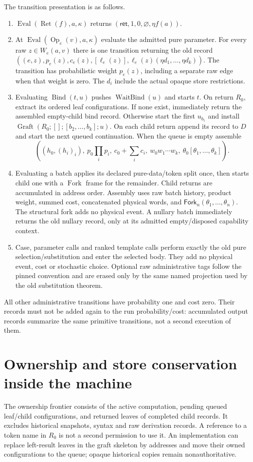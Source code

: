 \documentclass[11pt]{article}
\begin{document}
The transition presentation is as follows.
\begin{enumerate}
\item $\operatorname{Eval}(\operatorname{Ret}(f),a,\kappa)$ returns $(\mathsf{ret},1,0,\varnothing,\eta f(a))$.
\item At $\operatorname{Eval}(\operatorname{Op}_e(v),a,\kappa)$ evaluate the admitted pure parameter. For every raw $z\in W_e(a,v)$ there is one transition returning the old record $( (e,z),p_e(z),c_e(z),[\ell_e(z)],\ell_e(z)(\eta d_1,\ldots,\eta d_k))$. The transition has probabilistic weight $p_e(z)$, including a separate raw edge when that weight is zero. The $d_i$ include the actual opaque store restrictions.
\item Evaluating $\operatorname{Bind}(t,u)$ pushes $\operatorname{WaitBind}(u)$ and starts $t$. On return $R_0$, extract its ordered leaf configurations. If none exist, immediately return the assembled empty-child bind record. Otherwise start the first $u_{b_1}$ and install $\operatorname{Graft}(R_0;[];[b_2,\ldots,b_k];u)$. On each child return append its record to $D$ and start the next queued continuation. When the queue is empty assemble
\[
 ((h_0,(h_i)_i),\ p_0\prod_i p_i,\ c_0+\sum_i c_i,
 \ w_0w_1\cdots w_k,\ \theta_0[\theta_1,\ldots,\theta_k]).
\]
\item Evaluating a batch applies its declared pure-data/token split once, then starts child one with a $\operatorname{Fork}$ frame for the remainder. Child returns are accumulated in address order. Assembly uses raw batch history, product weight, summed cost, concatenated physical words, and $\mathsf{Fork}_n(\theta_1,\ldots,\theta_n)$. The structural fork adds no physical event. A nullary batch immediately returns the old nullary record, only at its admitted empty/disposed capability context.
\item Case, parameter calls and ranked template calls perform exactly the old pure selection/substitution and enter the selected body. They add no physical event, cost or stochastic choice. Optional raw administrative tags follow the pinned convention and are erased only by the same named projection used by the old substitution theorem.
\end{enumerate}
All other administrative transitions have probability one and cost zero. Their records must not be added again to the run probability/cost: accumulated output records summarize the same primitive transitions, not a second execution of them.

\section{Ownership and store conservation inside the machine}
The ownership frontier consists of the active computation, pending queued leaf/child configurations, and returned leaves of completed child records. It excludes historical snapshots, syntax and raw derivation records. A reference to a token name in $R_0$ is not a second permission to use it. An implementation can replace left-result leaves in the graft skeleton by addresses and move their owned configurations to the queue; opaque historical copies remain nonauthoritative.
\end{document}
